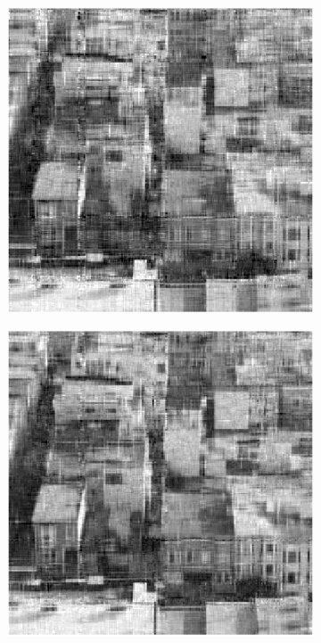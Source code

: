 \begin{figure}
    \begin{subfigure}{0.325\linewidth}
        \includegraphics[width=\linewidth]{Poglavja/Slike/kompleksna grayscale 300/rez35LMaFit.png}
    \end{subfigure}
    \hfill
    \begin{subfigure}{0.325\linewidth}
        \includegraphics[width=\linewidth]{Poglavja/Slike/kompleksna grayscale 300/rez45LMaFit.png}

\end{subfigure}
\end{figure}
